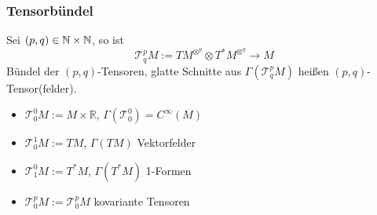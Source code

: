 \subsubsection{Tensorbündel}
\label{ssub:175}
Sei $(p,q)\in \mathbb{N}\times \mathbb{N}$, so ist
\[
\mathcal{T}^p_q M := TM^{\otimes^p}\otimes T^* M^{\otimes^q}\to M
\]
Bündel der $(p,q)$-Tensoren, glatte Schnitte aus $\Gamma(\mathcal{T}^p_q M)$ heißen $(p,q)$- Tensor(felder).
\begin{itemize}
\item $\mathcal{T}_0^0 M := M\times \mathds{R}$, $\Gamma(\mathcal{T}_0^0) = C^\infty (M)$
\item $\mathcal{T}_0^1 M := TM$, $\Gamma(TM)$ Vektorfelder
\item $\mathcal{T}_1^0 M := T^*M$, $\Gamma(T^* M)$ 1-Formen
\item $\mathcal{T}_0^p M := \mathcal{T}_0^p M$ kovariante Tensoren
\end{itemize}

